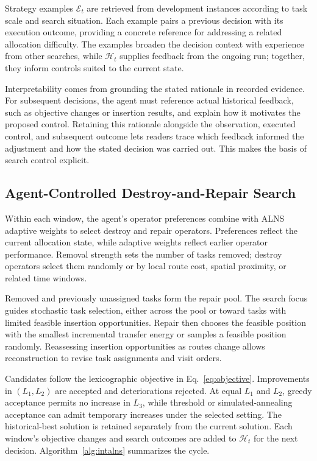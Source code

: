 Strategy examples $\mathcal E_t$ are retrieved from development instances according to task scale and search situation. Each example pairs a previous decision with its execution outcome, providing a concrete reference for addressing a related allocation difficulty. The examples broaden the decision context with experience from other searches, while $\mathcal H_t$ supplies feedback from the ongoing run; together, they inform controls suited to the current state.

Interpretability comes from grounding the stated rationale in recorded evidence. For subsequent decisions, the agent must reference actual historical feedback, such as objective changes or insertion results, and explain how it motivates the proposed control. Retaining this rationale alongside the observation, executed control, and subsequent outcome lets readers trace which feedback informed the adjustment and how the stated decision was carried out. This makes the basis of search control explicit.

\subsection{Agent-Controlled Destroy-and-Repair Search}
Within each window, the agent's operator preferences combine with ALNS adaptive weights to select destroy and repair operators. Preferences reflect the current allocation state, while adaptive weights reflect earlier operator performance. Removal strength sets the number of tasks removed; destroy operators select them randomly or by local route cost, spatial proximity, or related time windows.

Removed and previously unassigned tasks form the repair pool. The search focus guides stochastic task selection, either across the pool or toward tasks with limited feasible insertion opportunities. Repair then chooses the feasible position with the smallest incremental transfer energy or samples a feasible position randomly. Reassessing insertion opportunities as routes change allows reconstruction to revise task assignments and visit orders.

Candidates follow the lexicographic objective in Eq.~\eqref{eq:objective}. Improvements in $(L_1,L_2)$ are accepted and deteriorations rejected. At equal $L_1$ and $L_2$, greedy acceptance permits no increase in $L_3$, while threshold or simulated-annealing acceptance can admit temporary increases under the selected setting.\cite{santini2018} The historical-best solution is retained separately from the current solution. Each window's objective changes and search outcomes are added to $\mathcal H_t$ for the next decision. Algorithm~\ref{alg:intalns} summarizes the cycle.

